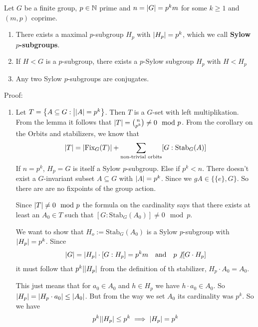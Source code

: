 \begin{ntheorem}
	Let $G$ be a finite group, $p \in \mathbb{N}$ prime and $n = \vert G\vert = p^{k}m$ for some $k \geq 1$ and $(m,p)$ coprime.
	\begin{enumerate}
		\item There exists a maximal $p$-subgroup $H_p$ with $\vert H_p\vert = p^{k}$, which we call \textbf{Sylow $p$-subgroups}.
		\item If $H < G$ is a $p$-subgroup, there exists a $p$-Sylow subgroup $H_p$ with $H < H_p$
		\item Any two Sylow $p$-subgroups are conjugates. 
	\end{enumerate}
\end{ntheorem}
Proof: 
\begin{enumerate}
	\item Let $T = \left\{A \subseteq G: \big\vert \vert A\vert = p^{k}\right\}$. Then $T$ is a $G$-set with left multiplikation. From the lemma it follows that $\vert T\vert = \binom{n}{p^{k}} \neq 0 \mod p$.
		From the corollary on the Orbits and stabilizers, we know that
		\begin{align*}
			\vert T\vert = \vert\text{Fix}_G(T)\vert + \sum_{\text{non-trivial orbits}} [G: \text{Stab}_G(A)]
		\end{align*}
		If $n = p^{k}$, $H_p = G$ is itself a Sylow $p$-subgroup. Else if $p^{k} < n$. There doesn't exist a $G$-invariant subset $A \subseteq G$ with $\vert A\vert = p^{k}$. Since we $g A \in \{\{e\},G\}$. So there are are no fixpoints of the group action.

		Since $\vert T\vert \neq 0 \mod p$ the formula on the cardinality says that there exists at least an $A_0 \in T$ such that $[G: \text{Stab}_G(A_0)] \neq 0 \mod p$.

		We want to show that $H_o := \text{Stab}_G(A_0)$ is a Sylow $p$-subgroup with $\vert H_p\vert = p^{k}$. Since
		\begin{align*}
			\vert G\vert = \vert H_p\vert \cdot [G: H_p] = p^{k}m \quad \text{and} \quad p\not| [G \cdot H_p]
		\end{align*}
		it must follow that $p^{k} | \vert H_p\vert$ from the definition of th stabilizer, $H_p \cdot A_0 = A_0$.
	
	This just means that for $a_0 \in A_0$ and $h \in H_p$ we have $h \cdot a_0 \in A_0$. So $\vert H_p\vert = \vert H_p \cdot a_0\vert \leq \vert A_0\vert$.
	But from the way we set $A_0$ its cardinality was $p^{k}$. So we have
	\begin{align*}
		p^{k}| \vert H_p\vert \leq p^{k} \implies \vert H_p\vert = p^{k}
	\end{align*}
	

\end{enumerate}
